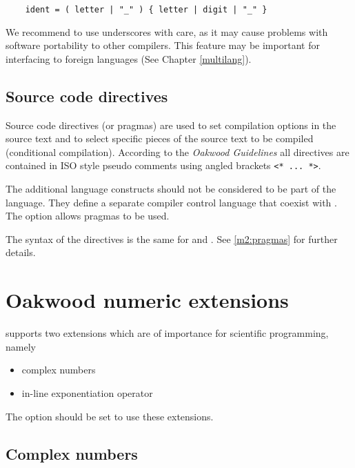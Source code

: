 \verb'    ident = ( letter | "_" ) { letter | digit | "_" }'

We recommend to use underscores with care, as it may cause
problems with software portability to other compilers. This
feature may be important for interfacing to foreign languages
(See Chapter \ref{multilang}).

\subsection{Source code directives}\label{o2:pragmas}

Source code directives (or pragmas) are used to set compilation
options in the source text and to select specific pieces of the source
text to be compiled (conditional compilation).  According to the {\em
Oakwood Guidelines} all directives are contained in ISO \mt{} style
pseudo comments using angled brackets \verb|<* ... *>|.

The additional language constructs should not be considered to be part
of the \ot{} language. They define a separate compiler control
language that coexist with \ot{}. The option  allows
pragmas to be used.

The syntax of the directives is the same for \mt{} and
\ot{}. See \ref{m2:pragmas} for further details.

\section{Oakwood numeric extensions}\label{o2:oakext}

\xds{} \ot{} supports two extensions which are of importance for
scientific programming, namely
\begin{itemize}
\item complex numbers
\item in-line exponentiation operator
\end{itemize}
The  option should be set to use these
extensions.

\subsection{Complex numbers}\label{o2:oakext:complex}

\onumextonly{}

